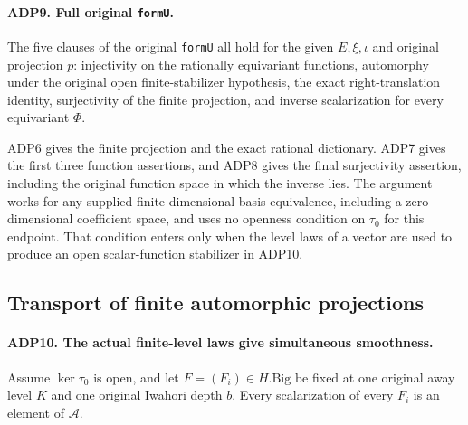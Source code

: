 \documentclass[11pt,a4paper]{article}
\numberwithin{equation}{section}
\theoremstyle{remark}\newtheorem{remark}[theorem]{Remark}
\begin{document}
\paragraph{ADP9. Full original \texttt{form\allowbreak U}.}
\label{claim:ADP9}
The five clauses of the original \texttt{form\allowbreak U} all hold for the given
\(E,\xi,\iota\) and original projection \(p\): injectivity on the
rationally equivariant functions, automorphy under the original open
finite-stabilizer hypothesis, the exact right-translation identity,
surjectivity of the finite projection, and inverse scalarization for every
equivariant \(\Phi\).

ADP6 gives the finite projection and the exact rational dictionary.
ADP7 gives the first three function assertions, and ADP8 gives the final
surjectivity assertion, including the original function space in which
the inverse lies.  The argument works for any supplied finite-dimensional
basis equivalence, including a zero-dimensional coefficient space, and
uses no openness condition on \(\tau_0\) for this endpoint.  That
condition enters only when the level laws of a vector are used to produce
an open scalar-function stabilizer in ADP10.

\subsection{Transport of finite automorphic projections}

\paragraph{ADP10. The actual finite-level laws give simultaneous smoothness.}
\label{claim:ADP10}
Assume \(\ker\tau_0\) is open, and let \(F=(F_i)\in H.\mathrm{Big}\)
be fixed at one original away level \(K\) and one original Iwahori
depth \(b\).  Every scalarization of every \(F_i\) is an element of
\(\mathcal A\).
\end{document}
